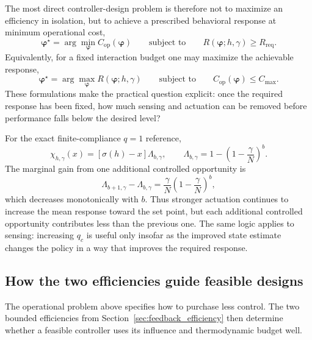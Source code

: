 The most direct controller-design problem is therefore not to maximize an efficiency in isolation, but to achieve a prescribed behavioral response at minimum operational cost,
\begin{equation}
\boxed{
\boldsymbol{\varphi}^\star
=
\arg\min_{\boldsymbol{\varphi}} C_{\mathrm{op}}(\boldsymbol{\varphi})
\qquad
\text{subject to}
\qquad
R(\boldsymbol{\varphi};h,\gamma)\ge R_{\mathrm{req}} .}
\label{eq:app_min_cost_problem}
\end{equation}
Equivalently, for a fixed interaction budget one may maximize the achievable response,
\begin{equation}
\boxed{
\boldsymbol{\varphi}^\star
=
\arg\max_{\boldsymbol{\varphi}} R(\boldsymbol{\varphi};h,\gamma)
\qquad
\text{subject to}
\qquad
C_{\mathrm{op}}(\boldsymbol{\varphi})\le C_{\max}.}
\label{eq:app_max_response_problem}
\end{equation}
These formulations make the practical question explicit: once the required response has been fixed, how much sensing and actuation can be removed before performance falls below the desired level?

For the exact finite-compliance \(q=1\) reference,
\begin{equation}
\chi_{h,\gamma}(x)
=
[\sigma(h)-x]\Lambda_{b,\gamma},
\qquad
\Lambda_{b,\gamma}
=
1-\left(1-\frac{\gamma}{N}\right)^b .
\label{eq:app_susceptibility_recall}
\end{equation}
The marginal gain from one additional controlled opportunity is
\begin{equation}
\Lambda_{b+1,\gamma}-\Lambda_{b,\gamma}
=
\frac{\gamma}{N}
\left(1-\frac{\gamma}{N}\right)^b,
\label{eq:app_marginal_actuation_gain}
\end{equation}
which decreases monotonically with \(b\). Thus stronger actuation continues to increase the mean response toward the set point, but each additional controlled opportunity contributes less than the previous one. The same logic applies to sensing: increasing \(q_c\) is useful only insofar as the improved state estimate changes the policy in a way that improves the required response.

\subsection{How the two efficiencies guide feasible designs}
\label{app:efficiency_guided_design}

The operational problem above specifies how to purchase less control. The two
bounded efficiencies from Section~\ref{sec:feedback_efficiency} then determine
whether a feasible controller uses its influence and thermodynamic budget well.

